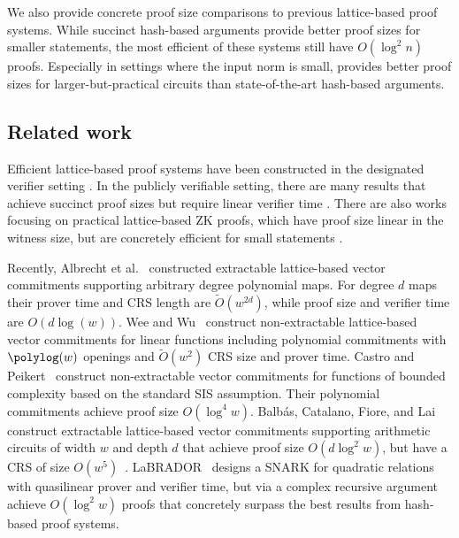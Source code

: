 We also provide concrete proof size comparisons to previous lattice-based proof systems. While succinct hash-based arguments provide better proof sizes for smaller statements, the most efficient of these systems still have $O(\log^2 n)$ proofs. Especially in settings where the input norm is small, \sys provides better proof sizes for larger-but-practical circuits than state-of-the-art hash-based arguments.

\subsection{Related work}
\label{sec:ow-related-work}

Efficient lattice-based proof systems have been constructed in the designated verifier setting \cite{GMNO18,ISW21}. In the publicly verifiable setting, there are many results that achieve succinct proof sizes but require linear verifier time \cite{BBCPGL18,C:BLNS20,C:AttCraKoh21,C:BooChiSot21,BS22}. There are also works focusing on practical lattice-based ZK proofs, which have proof size linear in the witness size, but are concretely efficient for small statements \cite{ESLL19, ALS20, ENS20,ESLR22, LNP22}.

Recently, Albrecht et al.~\cite{C:ACLMT22} constructed extractable lattice-based vector commitments supporting arbitrary degree polynomial maps. For degree $d$ maps their prover time and CRS length are $\tilde{O}(w^{2d})$, while proof size and verifier time are $O(d \log(w))$. Wee and Wu~\cite{WW22} construct non-extractable lattice-based vector commitments for linear functions including polynomial commitments with $\polylog(w)$ openings and $\tilde{O}(w^2)$ CRS size and prover time. Castro and Peikert~\cite{CP22} construct non-extractable vector commitments for functions of bounded complexity based on the standard SIS assumption. Their polynomial commitments achieve proof size $O(\log^4 w)$. Balb\'{a}s, Catalano, Fiore, and Lai construct extractable lattice-based vector commitments supporting arithmetic circuits of width $w$ and depth $d$ that achieve proof size $O(d \log^2 w)$, but have a CRS of size $O(w^5)$~\cite{EPRINT:BCFL22}. LaBRADOR~\cite{BS22} designs a SNARK for quadratic relations with quasilinear prover and verifier time, but via a complex recursive argument achieve $O(\log^2 w)$ proofs that concretely surpass the best results from hash-based proof systems.

